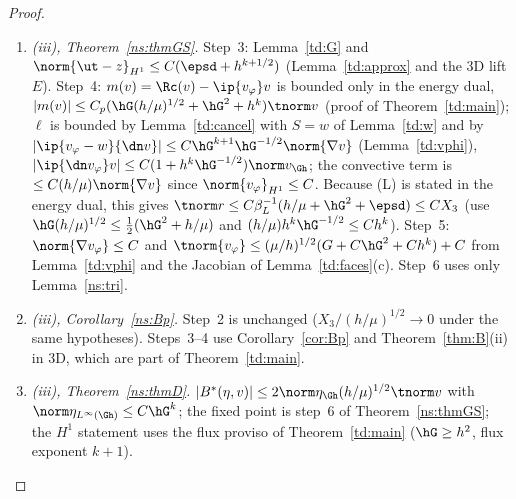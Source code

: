 \begin{proof}
\begin{enumerate}
so $\varphi=\curl\zeta$ with a vector potential $\zeta\in H^3$, $\norm\zeta_{H^3}\le C\norm\varphi_{H^2}$ (a bounded regularised Poincar\'e/Bogovski\u\i-type
potential operator on the shell); extend $\zeta$ by a Hestenes reflection of order $3$ and put $\tilde\varphi:=\curl\tilde\zeta$, so $\div\tilde\varphi=0$
(the same device as the extension of $\ut$ in Section~\ref{td:setting}, checked in \texttt{referee6}). Only $\tilde\varphi|_\Omega=\varphi$, hence
$\tilde\varphi|_\Gamma=0$, is used below. Lemma~\ref{n2:Y}: $H^2\subset C^0$ in 3D, so $I_h\tilde\varphi$ is defined; the radial estimate gives
$\norm{\tilde\varphi}_{\Gh}\le C\hG\norm{\nabla\tilde\varphi}_{S_h}\le C\hG\,|S_h|^{1/3}\norm{\nabla\tilde\varphi}_{L^6}\le C\hG^{5/3}\norm\varphi_{H^2}$; the scaled
trace gives $\norm{\tilde\varphi-I_h\tilde\varphi}_{L^2(F)}\le C(\diam F)^{3/2}|\tilde\varphi|_{H^2(T_F)}$; the nodal lift has $\norm{\nabla L_0}\le C\hG^{-1/2}\norm t_{\Gh}$
(nodal values $\le C(\diam F)^{-1}\norm t_F$, $\norm{\nabla\phi_i}_T\le C(\diam T)^{1/2}$); the Bogovskii step is (IS3). Lemma~\ref{n2:dual} then holds with
the same proof, and Theorem~\ref{n2:L} follows.
\item \emph{(iii), Theorem~\ref{ns:thmGS}.} Step~3: Lemma~\ref{td:G} and $\norm{\ut-z}_{H^1}\le C(\epsd+h^{k+1/2})$ (Lemma~\ref{td:approx} and the 3D lift $E$).
Step~4: $m(v)=\Rc(v)-\ip{v_\varphi}v$ is bounded only in the energy dual, $|m(v)|\le C_p(\hG(h/\mu)^{1/2}+\hG^2+h^k)\tnorm v$ (proof of
Theorem~\ref{td:main}); $\ell$ is bounded by Lemma~\ref{td:cancel} with $S=w$ of Lemma~\ref{td:w} and by
$|\ip{v_\varphi-w}{\dn v}|\le C\hG^{k+1}\hG^{-1/2}\norm{\nabla v}$ (Lemma~\ref{td:vphi}), $|\ip{\dn v_\varphi}v|\le C(1+h^k\hG^{-1/2})\norm v_{\Gh}$;
the convective term is $\le C(h/\mu)\norm{\nabla v}$ since $\norm{v_\varphi}_{H^1}\le C$. Because (L) is stated in the energy dual, this gives
$\tnorm r\le C\beta_L^{-1}(h/\mu+\hG^2+\epsd)\le CX_3$ (use $\hG(h/\mu)^{1/2}\le\frac12(\hG^2+h/\mu)$ and $(h/\mu)h^k\hG^{-1/2}\le Ch^k$).
Step~5: $\norm{\nabla v_\varphi}\le C$ and $\tnorm{v_\varphi}\le(\mu/h)^{1/2}(G+C\hG^2+Ch^k)+C$ from Lemma~\ref{td:vphi} and the Jacobian of
Lemma~\ref{td:faces}(c). Step~6 uses only Lemma~\ref{ns:tri}.
\item \emph{(iii), Corollary~\ref{ns:Bp}.} Step~2 is unchanged ($X_3/(h/\mu)^{1/2}\to0$ under the same hypotheses). Steps~3--4 use
Corollary~\ref{cor:Bp} and Theorem~\ref{thm:B}(ii) in 3D, which are part of Theorem~\ref{td:main}.
\item \emph{(iii), Theorem~\ref{ns:thmD}.} $|B^\ast(\eta,v)|\le2\norm\eta_{\Gh}(h/\mu)^{1/2}\tnorm v$ with $\norm\eta_{L^\infty(\Gh)}\le C\hG^k$; the fixed point is step~6 of
Theorem~\ref{ns:thmGS}; the $H^1$ statement uses the flux proviso of Theorem~\ref{td:main} ($\hG\ge h^2$, flux exponent $k+1$).\qedhere
\end{enumerate}
\end{proof}

